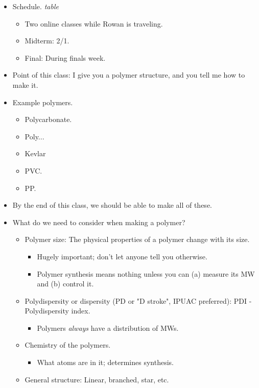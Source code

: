 \documentclass[../notes.tex]{subfiles}
\begin{document}
\begin{itemize}
    \item Schedule.
    \emph{table}
    \begin{itemize}
        \item Two online classes while Rowan is traveling.
        \item Midterm: 2/1.
        \item Final: During finals week.
    \end{itemize}
    \item Point of this class: I give you a polymer structure, and you tell me how to make it.
    \item Example polymers.
    \begin{itemize}
        \item Polycarbonate.
        \item Poly...
        \item Kevlar
        \item PVC.
        \item PP.
    \end{itemize}
    \item By the end of this class, we should be able to make all of these.
    \item What do we need to consider when making a polymer?
    \begin{itemize}
        \item Polymer size: The physical properties of a polymer change with its size.
        \begin{itemize}
            \item Hugely important; don't let anyone tell you otherwise.
            \item Polymer synthesis means nothing unless you can (a) measure its MW and (b) control it.
        \end{itemize}
        \item Polydispersity or dispersity (PD or "D stroke", IPUAC preferred): PDI - Polydispersity index.
        \begin{itemize}
            \item Polymers \emph{always} have a distribution of MWs.
        \end{itemize}
        \item Chemistry of the polymers.
        \begin{itemize}
            \item What atoms are in it; determines synthesis.
        \end{itemize}
        \item General structure: Linear, branched, star, etc.

\end{itemize}
\end{itemize}
\end{document}
